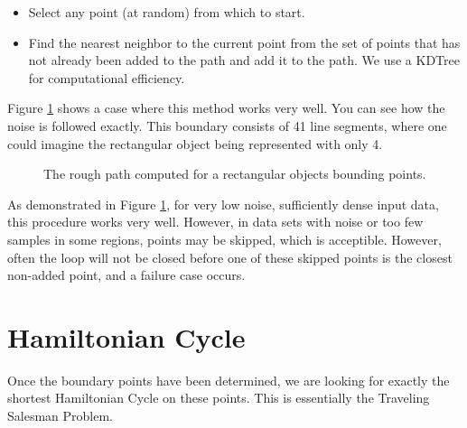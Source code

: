 \documentclass{InsightArticle}
\begin{document}
\begin{itemize}
 \item Select any point (at random) from which to start.
 \item Find the nearest neighbor to the current point from the set of points that has not already been added to the path and add it to the path. We use a KDTree for computational efficiency.
\end{itemize}

Figure \ref{fig:RoughBoundary} shows a case where this method works very well. You can see how the noise is followed exactly. This boundary consists of 41 line segments, where one could imagine the rectangular object being represented with only 4.
\begin{figure}[H]
\centering
{}
\caption{The rough path computed for a rectangular objects bounding points.}
\label{fig:RoughBoundary}
\end{figure}

As demonstrated in Figure \ref{fig:RoughBoundary}, for very low noise, sufficiently dense input data, this procedure works very well. However, in data sets with noise or too few samples in some regions, points may be skipped, which is acceptible. However, often the loop will not be closed before one of these skipped points is the closest non-added point, and a failure case occurs.

\section{Hamiltonian Cycle}
Once the boundary points have been determined, we are looking for exactly the shortest Hamiltonian Cycle on these points. This is essentially the Traveling Salesman Problem.
\end{document}
